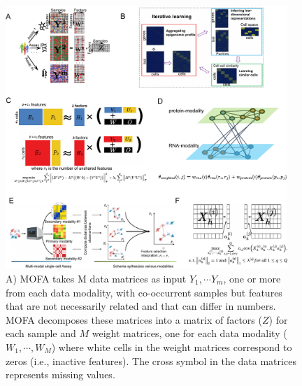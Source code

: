 \begin{figure}[!hb]
	\centering
	\includegraphics[width=0.95\textwidth]{multimodal_integration_methods_schematic/fig}
	\vspace{0.1cm}
	\caption[Illustration of mulitmodal integration competing methods schematic.]{
	A) MOFA takes M data matrices as input $Y_1, \cdots Y_m$, one or more from each data modality, with co-occurrent samples but features that are not necessarily related and that can differ in numbers. MOFA decomposes these matrices into a matrix of factors ($Z$) for each sample and $M$ weight matrices, one for each data modality ($W_1,\cdots, W_M$) where white cells in the weight matrices correspond to zeros (i.e., inactive features). The cross symbol in the data matrices represents missing values. 
}
	\label{fig:multimodal_integration_methods_schematic}
\end{figure}

